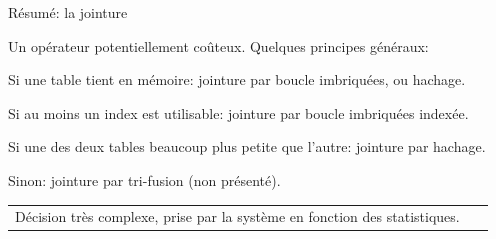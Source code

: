 \begin{frame}{Résumé: la jointure}

Un opérateur potentiellement coûteux. Quelques principes généraux:

\vfill

\begin{redbullet}

   \item Si \alert{une} table tient en mémoire: jointure par boucle imbriquées, ou hachage.

\item
 Si \alert{au moins un} index est utilisable: jointure par boucle imbriquées indexée.

\item
Si une des deux tables beaucoup plus petite que l'autre: jointure par hachage.

\item

Sinon: jointure par tri-fusion (non présenté).

\end{redbullet}

\vfill

\begin{tabular}{p{9cm}p{5cm}}

\alert{Décision très complexe}, prise par la système en fonction des statistiques.

&
~
\end{tabular}



\end{frame}